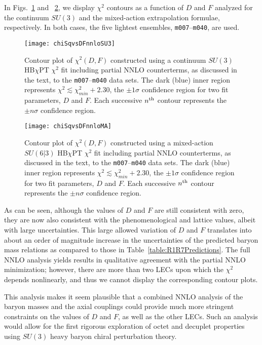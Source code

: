 \documentclass[twocolumn,nofootinbib,prd,aps,superscriptaddress,tightenlines]{revtex4}
\begin{document}
In Figs.~\ref{fig:chisqnnloct} and ~\ref{fig:chisqnnloctMA}, we display $\chi^2$ contours as a function of $D$ and $F$ analyzed for the continuum $SU(3)$ and the mixed-action extrapolation formulae, respectively.  In both cases, the five lightest ensembles, \texttt{m007}--\texttt{m040}, are used.
\begin{figure}[th]
\texttt{[image: chiSqvsDFnnloSU3]}
\caption{\label{fig:chisqnnloct}Contour plot of $\chi^2(D,F)$ constructed using a continuum $SU(3)$ HB$\chi$PT $\chi^2$ fit including partial NNLO counterterms, as discussed in the text, to the \texttt{m007}--\texttt{m040} data sets.  The dark (blue) inner region represents $\chi^2 \lesssim \chi^2_{min} + 2.30$, the $\pm1\sigma$ confidence region for two fit parameters, $D$ and $F$.  Each successive $n^{\rm th}$ contour represents the $\pm n \sigma$ confidence region. }
\end{figure}
\begin{figure}[th]
\texttt{[image: chiSqvsDFnnloMA]}
\caption{\label{fig:chisqnnloctMA}Contour plot of $\chi^2(D,F)$ constructed using a mixed-action $SU(6|3)$ HB$\chi$PT $\chi^2$ fit including partial NNLO counterterms, as discussed in the text, to the \texttt{m007}--\texttt{m040} data sets.  The dark (blue) inner region represents $\chi^2 \lesssim \chi^2_{min} + 2.30$, the $\pm1\sigma$ confidence region for two fit parameters, $D$ and $F$.  Each successive $n^{\rm th}$ contour represents the $\pm n \sigma$ confidence region. }
\end{figure}
As can be seen, although the values of $D$ and $F$ are still consistent with zero, they are now also consistent with the phenomenological and lattice values, albeit with large uncertainties.  This large allowed variation of $D$ and $F$ translates into about an order of magnitude increase in the uncertainties of the predicted baryon mass relations as compared to those in Table~\ref{table:R1R7Predictions}.  The full NNLO analysis yields results in qualitative agreement with the partial NNLO minimization; however, there are more than two LECs upon which the $\chi^2$ depends nonlinearly, and thus we cannot display the corresponding contour plots.


This analysis makes it seem plausible that a combined NNLO analysis of the baryon masses and the axial couplings could provide much more stringent constraints on the values of $D$ and $F$, as well as the other LECs.  Such an analysis would allow for the first rigorous exploration of octet and decuplet properties using $SU(3)$ heavy baryon chiral perturbation theory.
\end{document}
